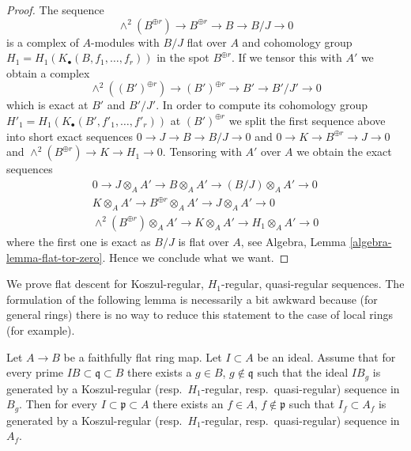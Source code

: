 \begin{proof}
The sequence
$$
\wedge^2(B^{\oplus r}) \to B^{\oplus r} \to B \to B/J \to 0
$$
is a complex of $A$-modules with $B/J$ flat over $A$ and
cohomology group $H_1 = H_1(K_\bullet(B, f_1, \ldots, f_r))$ in the spot
$B^{\oplus r}$. If we tensor this with $A'$ we obtain a complex
$$
\wedge^2((B')^{\oplus r}) \to (B')^{\oplus r} \to B' \to B'/J' \to 0
$$
which is exact at $B'$ and $B'/J'$. In order to compute its
cohomology group $H'_1 = H_1(K_\bullet(B', f'_1, \ldots, f'_r))$
at $(B')^{\oplus r}$ we split the first sequence above into
short exact sequences
$0 \to J \to B \to B/J \to 0$ and
$0 \to K \to B^{\oplus r} \to J \to 0$ and
$\wedge^2(B^{\oplus r}) \to K \to H_1 \to 0$.
Tensoring with $A'$ over $A$ we obtain the exact sequences
$$
\begin{matrix}
0 \to J \otimes_A A' \to B \otimes_A A' \to (B/J) \otimes_A A' \to 0 \\
K \otimes_A A' \to B^{\oplus r} \otimes_A A' \to J \otimes_A A' \to 0 \\
\wedge^2(B^{\oplus r}) \otimes_A A' \to K \otimes_A A' \to H_1 \otimes_A A'
\to 0
\end{matrix}
$$
where the first one is exact as $B/J$ is flat over $A$, see
Algebra, Lemma \ref{algebra-lemma-flat-tor-zero}.
Hence we conclude what we want.
\end{proof}

\noindent
We prove flat descent for Koszul-regular, $H_1$-regular, quasi-regular
sequences. The formulation of the following lemma is necessarily a bit awkward
because (for general rings) there is no way to reduce this statement to
the case of local rings (for example).

\begin{lemma}
\label{lemma-flat-descent-regular-ideal}
Let $A \to B$ be a faithfully flat ring map. Let $I \subset A$ be an ideal.
Assume that for every prime $IB \subset \mathfrak q \subset B$ there exists a
$g \in B$, $g \not \in \mathfrak q$ such that the ideal $IB_g$
is generated by a Koszul-regular
(resp.\ $H_1$-regular, resp.\ quasi-regular) sequence in $B_g$.
Then for every $I \subset \mathfrak p \subset A$ there exists an
$f \in A$, $f \not \in \mathfrak p$ such that
$I_f \subset A_f$ is generated by a  Koszul-regular
(resp.\ $H_1$-regular, resp.\ quasi-regular) sequence in $A_f$.
\end{lemma}

